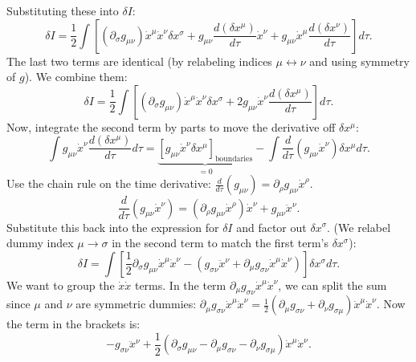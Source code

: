 \documentclass[11pt, a4paper]{report}
\begin{document}
Substituting these into \(\delta I\):
\begin{equation}
\delta I = \frac{1}{2} \int \left[ (\partial_\sigma g_{\mu\nu}) \dot{x}^\mu \dot{x}^\nu \delta x^\sigma + g_{\mu\nu} \frac{d(\delta x^\mu)}{d\tau} \dot{x}^\nu + g_{\mu\nu} \dot{x}^\mu \frac{d(\delta x^\nu)}{d\tau} \right] d\tau.
\end{equation}
The last two terms are identical (by relabeling indices \(\mu \leftrightarrow \nu\) and using symmetry of \(g\)). We combine them:
\begin{equation}
\delta I = \frac{1}{2} \int \left[ (\partial_\sigma g_{\mu\nu}) \dot{x}^\mu \dot{x}^\nu \delta x^\sigma + 2 g_{\mu\nu} \dot{x}^\nu \frac{d(\delta x^\mu)}{d\tau} \right] d\tau.
\end{equation}
Now, integrate the second term by parts to move the derivative off \(\delta x^\mu\):
\begin{equation}
\int g_{\mu\nu} \dot{x}^\nu \frac{d(\delta x^\mu)}{d\tau} d\tau = \underbrace{\left[ g_{\mu\nu} \dot{x}^\nu \delta x^\mu \right]_{\text{boundaries}}}_{=0} - \int \frac{d}{d\tau} (g_{\mu\nu} \dot{x}^\nu) \delta x^\mu d\tau.
\end{equation}
Use the chain rule on the time derivative: \(\frac{d}{d\tau} (g_{\mu\nu}) = \partial_\rho g_{\mu\nu} \dot{x}^\rho\).
\begin{equation}
\frac{d}{d\tau} (g_{\mu\nu} \dot{x}^\nu) = (\partial_\rho g_{\mu\nu} \dot{x}^\rho) \dot{x}^\nu + g_{\mu\nu} \ddot{x}^\nu.
\end{equation}
Substitute this back into the expression for \(\delta I\) and factor out \(\delta x^\sigma\). (We relabel dummy index \(\mu \to \sigma\) in the second term to match the first term's \(\delta x^\sigma\)):
\begin{equation}
\delta I = \int \left[ \frac{1}{2} \partial_\sigma g_{\mu\nu} \dot{x}^\mu \dot{x}^\nu - \left( g_{\sigma\nu} \ddot{x}^\nu + \partial_\mu g_{\sigma\nu} \dot{x}^\mu \dot{x}^\nu \right) \right] \delta x^\sigma d\tau.
\end{equation}
We want to group the \(\dot{x} \dot{x}\) terms. In the term \(\partial_\mu g_{\sigma\nu} \dot{x}^\mu \dot{x}^\nu\), we can split the sum since \(\mu\) and \(\nu\) are symmetric dummies: \(\partial_\mu g_{\sigma\nu} \dot{x}^\mu \dot{x}^\nu = \frac{1}{2} (\partial_\mu g_{\sigma\nu} + \partial_\nu g_{\sigma\mu}) \dot{x}^\mu \dot{x}^\nu\).
Now the term in the brackets is:
\begin{equation}
-g_{\sigma\nu} \ddot{x}^\nu + \frac{1}{2} \left( \partial_\sigma g_{\mu\nu} - \partial_\mu g_{\sigma\nu} - \partial_\nu g_{\sigma\mu} \right) \dot{x}^\mu \dot{x}^\nu.
\end{equation}
\end{document}
